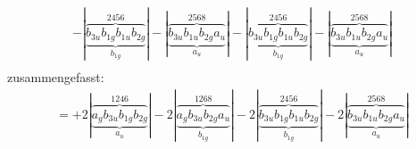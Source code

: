 \documentclass{article}
\begin{document}
\begin{multline*}
-\left|\underbrace{\overbrace{b_{3u} b_{1g} b_{1u} b_{2g}}^{2 4 5 6}}_{b_{1g}}\right|-\left|\underbrace{\overbrace{b_{3u} b_{1u} b_{2g} a_{u}}^{2 5 6 8}}_{a_{u}}\right|-\left|\underbrace{\overbrace{b_{3u} b_{1g} b_{1u} b_{2g}}^{2 4 5 6}}_{b_{1g}}\right|-\left|\underbrace{\overbrace{b_{3u} b_{1u} b_{2g} a_{u}}^{2 5 6 8}}_{a_{u}}\right|\\
\end{multline*}zusammengefasst:\begin{multline*}
=+2\left|\underbrace{\overbrace{a_{g} b_{3u} b_{1g} b_{2g}}^{1 2 4 6}}_{a_{u}}\right|-2\left|\underbrace{\overbrace{a_{g} b_{3u} b_{2g} a_{u}}^{1 2 6 8}}_{b_{1g}}\right|-2\left|\underbrace{\overbrace{b_{3u} b_{1g} b_{1u} b_{2g}}^{2 4 5 6}}_{b_{1g}}\right|-2\left|\underbrace{\overbrace{b_{3u} b_{1u} b_{2g} a_{u}}^{2 5 6 8}}_{a_{u}}\right|\\
\end{multline*}\\ \\
\vspace{0.5cm}
\end{document}
